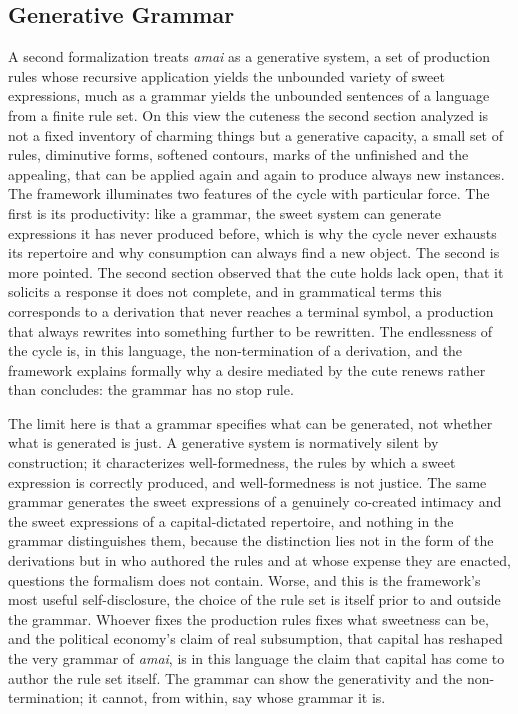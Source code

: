 \subsection{Generative Grammar}

A second formalization treats \textit{amai} as a generative system, a set of production rules whose recursive application yields the unbounded variety of sweet expressions, much as a grammar yields the unbounded sentences of a language from a finite rule set. On this view the cuteness the second section analyzed is not a fixed inventory of charming things but a generative capacity, a small set of rules, diminutive forms, softened contours, marks of the unfinished and the appealing, that can be applied again and again to produce always new instances. The framework illuminates two features of the cycle with particular force. The first is its productivity: like a grammar, the sweet system can generate expressions it has never produced before, which is why the cycle never exhausts its repertoire and why consumption can always find a new object. The second is more pointed. The second section observed that the cute holds lack open, that it solicits a response it does not complete, and in grammatical terms this corresponds to a derivation that never reaches a terminal symbol, a production that always rewrites into something further to be rewritten. The endlessness of the cycle is, in this language, the non-termination of a derivation, and the framework explains formally why a desire mediated by the cute renews rather than concludes: the grammar has no stop rule.

The limit here is that a grammar specifies what can be generated, not whether what is generated is just. A generative system is normatively silent by construction; it characterizes well-formedness, the rules by which a sweet expression is correctly produced, and well-formedness is not justice. The same grammar generates the sweet expressions of a genuinely co-created intimacy and the sweet expressions of a capital-dictated repertoire, and nothing in the grammar distinguishes them, because the distinction lies not in the form of the derivations but in who authored the rules and at whose expense they are enacted, questions the formalism does not contain. Worse, and this is the framework's most useful self-disclosure, the choice of the rule set is itself prior to and outside the grammar. Whoever fixes the production rules fixes what sweetness can be, and the political economy's claim of real subsumption, that capital has reshaped the very grammar of \textit{amai}, is in this language the claim that capital has come to author the rule set itself. The grammar can show the generativity and the non-termination; it cannot, from within, say whose grammar it is.

